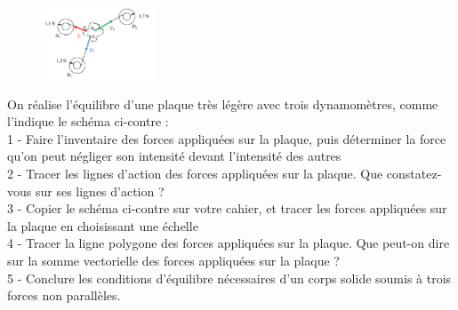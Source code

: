 \documentclass[12pt]{article}
\begin{document}
\begin{figure}
\includegraphics[width=0.3\textwidth]{./img/img01.png}
\end{figure}

On réalise l’équilibre d’une plaque très légère avec trois dynamomètres, comme l’indique le schéma ci-contre : 
\\1 - Faire l’inventaire des forces appliquées sur la plaque, puis déterminer la force qu’on peut négliger son
intensité devant l'intensité des autres
\\2 - Tracer les lignes d’action des forces appliquées sur la plaque.
Que constatez-vous sur ses lignes d’action ?
\\3 - Copier le schéma ci-contre sur votre cahier, et tracer les forces
appliquées sur la plaque en choisissant une échelle
\\4 - Tracer la ligne polygone des forces appliquées sur la plaque.
Que peut-on dire sur la somme vectorielle des forces
appliquées sur la plaque ?
\\5 - Conclure les conditions d'équilibre nécessaires d’un corps
solide soumis à trois forces non parallèles.
\end{document}
